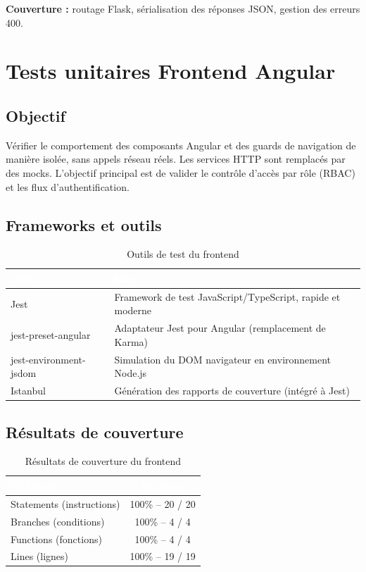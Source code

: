 \documentclass[12pt,a4paper]{report}
\newcommand{\thead}[1]{\cellcolor{tablehead}\textcolor{white}{\textbf{#1}}}
\begin{document}
\textbf{Couverture :} routage Flask, sérialisation des réponses JSON,
gestion des erreurs 400.

\section{Tests unitaires Frontend Angular}
\label{sec:ch9-frontend}

\subsection{Objectif}

Vérifier le comportement des composants Angular et des guards de
navigation de manière isolée, sans appels réseau réels. Les services HTTP
sont remplacés par des mocks. L'objectif principal est de valider le
contrôle d'accès par rôle (RBAC) et les flux d'authentification.

\subsection{Frameworks et outils}

\begin{table}[H]
  \centering
  \caption{Outils de test du frontend}
  \label{tab:tests_outils_front}
  \begin{tabularx}{\textwidth}{|l|Y|}
    \hline
    \thead{Outil} & \thead{Rôle} \\
    \hline
    Jest & Framework de test JavaScript/TypeScript, rapide et moderne \\
    jest-preset-angular & Adaptateur Jest pour Angular (remplacement de Karma) \\
    jest-environment-jsdom & Simulation du DOM navigateur en environnement Node.js \\
    Istanbul & Génération des rapports de couverture (intégré à Jest) \\
    \hline
  \end{tabularx}
\end{table}

\subsection{Résultats de couverture}

\begin{table}[H]
  \centering
  \caption{Résultats de couverture du frontend}
  \label{tab:tests_couv_front}
  \begin{tabularx}{\textwidth}{|l|c|}
    \hline
    \thead{Métrique} & \thead{Résultat} \\
    \hline
    Statements (instructions) & 100\% -- 20 / 20 \\
    Branches (conditions) & 100\% -- 4 / 4 \\
    Functions (fonctions) & 100\% -- 4 / 4 \\
    Lines (lignes) & 100\% -- 19 / 19 \\
    \hline
  \end{tabularx}
\end{table}
\end{document}

